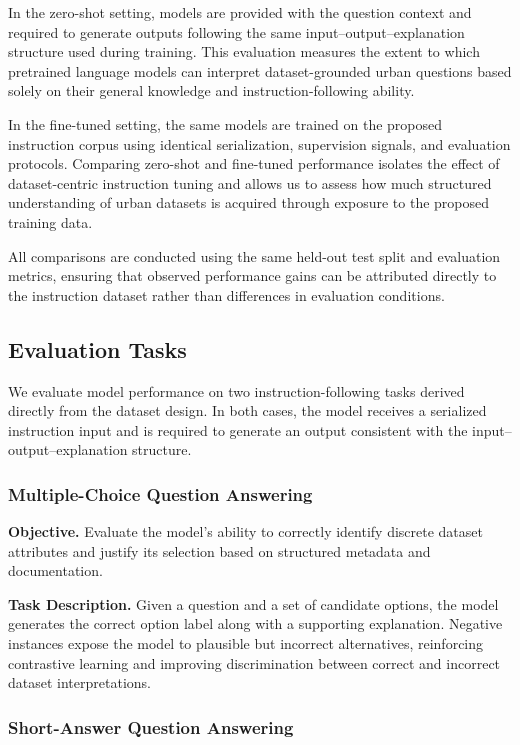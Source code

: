 \documentclass[a4paper,fleqn]{cas-sc}
\begin{document}
In the zero-shot setting, models are provided with the question context and required to generate outputs following the same input--output--explanation structure used during training.
This evaluation measures the extent to which pretrained language models can interpret dataset-grounded urban questions based solely on their general knowledge and instruction-following ability.

In the fine-tuned setting, the same models are trained on the proposed instruction corpus using identical serialization, supervision signals, and evaluation protocols.
Comparing zero-shot and fine-tuned performance isolates the effect of dataset-centric instruction tuning and allows us to assess how much structured understanding of urban datasets is acquired through exposure to the proposed training data.

All comparisons are conducted using the same held-out test split and evaluation metrics, ensuring that observed performance gains can be attributed directly to the instruction dataset rather than differences in evaluation conditions.


\subsection{Evaluation Tasks}

We evaluate model performance on two instruction-following tasks derived directly from the dataset design.
In both cases, the model receives a serialized instruction input and is required to generate an output consistent with the input--output--explanation structure.

\subsubsection{Multiple-Choice Question Answering}

\textbf{Objective.}
Evaluate the model’s ability to correctly identify discrete dataset attributes and justify its selection based on structured metadata and documentation.

\textbf{Task Description.}
Given a question and a set of candidate options, the model generates the correct option label along with a supporting explanation.
Negative instances expose the model to plausible but incorrect alternatives, reinforcing contrastive learning and improving discrimination between correct and incorrect dataset interpretations.

\subsubsection{Short-Answer Question Answering}
\end{document}
